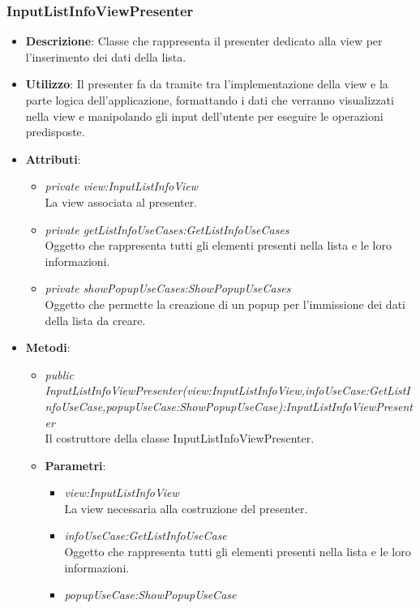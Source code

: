 \subsubsection{InputListInfoViewPresenter}
\begin{itemize}
\item \textbf{Descrizione}: Classe che rappresenta il presenter dedicato alla view per l'inserimento dei dati della lista.
\item \textbf{Utilizzo}: Il presenter fa da tramite tra l'implementazione della view e la parte logica dell'applicazione, formattando i dati che verranno visualizzati nella view e manipolando gli input dell'utente per eseguire le operazioni predisposte.
\item \textbf{Attributi}: 	
	\begin{itemize}
	\item \textit{private view:InputListInfoView}\\
		La view associata al presenter.
	\item \textit{private getListInfoUseCases:GetListInfoUseCases}\\
		Oggetto che rappresenta tutti gli elementi presenti nella lista e le loro informazioni.
	\item \textit{private showPopupUseCases:ShowPopupUseCases}\\
		Oggetto che permette la creazione di un popup per l'immissione dei dati della lista da creare.	
		\end{itemize}
\item \textbf{Metodi}:
	\begin{itemize}	
	\item \textit{public InputListInfoViewPresenter(view:InputListInfoView,infoUseCase:GetListInfoUseCase,popupUseCase:ShowPopupUseCase):InputListInfoViewPresenter}\\
	Il costruttore della classe InputListInfoViewPresenter.
			\item{\textbf{Parametri}: \begin{itemize}
			\item \textit{view:InputListInfoView}\\
			La view necessaria alla costruzione del presenter.
			\item \textit{infoUseCase:GetListInfoUseCase}\\
				Oggetto che rappresenta tutti gli elementi presenti nella lista e le loro informazioni.
			\item \textit{popupUseCase:ShowPopupUseCase}\\

\end{itemize}}
\end{itemize}
\end{itemize}

